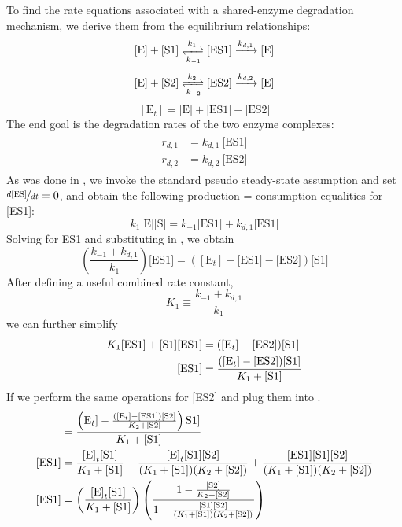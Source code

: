 To find the rate equations associated with a shared-enzyme degradation mechanism, we derive them from the equilibrium relationships:
\begin{equation*}
  \text{[E]} + \text{[S1]} \xrightleftharpoons[k_{-1}]{k_1} \text{[ES1]} \xrightarrow{k_{d,1}} \text{[E]}
\end{equation*}
\begin{equation*}
  \text{[E]} + \text{[S2]} \xrightleftharpoons[k_{-2}]{k_2}  \text{[ES2]} \xrightarrow{k_{d,2}} \text{[E]}
\end{equation*}
\begin{equation} \label{eq:totE}
  [\text{E}_t] = \text{[E]} + \text{[ES1]} + \text{[ES2]}
\end{equation}
The end goal is the degradation rates of the two enzyme complexes:
\begin{align}
  \begin{split}\label{eq:r1}
    r_{d,1} &= k_{d,1} \ \text{[ES1]}\\
    r_{d,2} &= k_{d,2} \ \text{[ES2]}
  \end{split}
\end{align}
As was done in , we invoke the standard pseudo steady-state assumption and set $\nicefrac{d[\text{ES}]}{dt}=0$, and obtain the following production = consumption equalities for [ES1]:
\begin{equation} \label{eq:pss}
  k_1\text{[E]}\text{[S]} = k_{-1}\text{[ES1]} + k_{d,1}\text{[ES1]}
\end{equation}
Solving  for ES1 and substituting in , we obtain
\begin{equation*}
  \left(\frac{k_{-1}+k_{d,1}}{k_1}\right)\text{[ES1]} = \left([\text{E}_t] - \text{[ES1]} - \text{[ES2]}\right)\text{[S1]}
\end{equation*}
After defining a useful combined rate constant,
\begin{equation*}
  K_1 \equiv \frac{k_{-1}+k_{d,1}}{k_1}
\end{equation*}
we can further simplify
\begin{align}
  K_1 \text{[ES1]} + \text{[S1]}\text{[ES1]} &= ([\text{E}_t] - [\text{ES2}])[\text{S1}] \notag\\
  [\text{ES1}] &= \frac{([\text{E}_t] - [\text{ES2}])[\text{S1}]}{K_1 + [\text{S1}]} \label{eq:eqabove}
\end{align}
If we perform the same operations for [ES2] and plug them into .
\begin{align}
  [\text{ES1}] &= \frac{\left(\text{E}_t] - \frac{([\text{E}_t] - [\text{ES1}])[\text{S2}]}{K_2 + [\text{S2}]}\right)\text{S1}]}{K_1 + [\text{S1}]} \notag\\
  [\text{ES1}] &= \frac{\text{[E]}_t \text{[S1]}}{K_1 + \text{[S1]}} - \frac{\text{[E]}_t \text{[S1]} \text{[S2]}}{(K_1 + \text{[S1]}) (K_2 + \text{[S2]})} + \frac{\text{[ES1]} \text{[S1]} \text{[S2]}}{(K_1 + \text{[S1]}) (K_2 + \text{[S2]})} \notag\\
  \label{eq:twofracs}
  [\text{ES1}] &= \left(\frac{\text{[E]}_t \text{[S1]}}{K_1 + \text{[S1]}}\right) \left(\frac{1 - \frac{\text{[S2]}}{K_2 + \text{[S2]}}}{1 - \frac{\text{[S1]} \text{[S2]}}{(K_1 + \text{[S1]}) (K_2 + \text{[S2]})}}\right)
\end{align}
